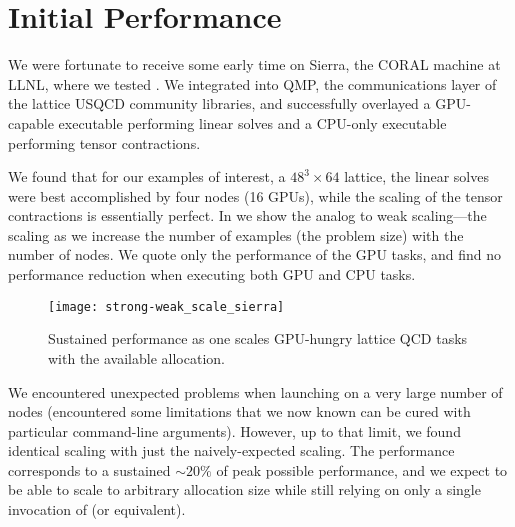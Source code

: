 \section{Initial Performance}
\label{sec:performance}

We were fortunate to receive some early time on Sierra, the CORAL machine at LLNL, where we tested \mpijm.
We integrated \mpijm into QMP\cite{githubQMP}, the communications layer of the lattice USQCD community libraries, and successfully overlayed a GPU-capable executable performing linear solves and a CPU-only executable performing tensor contractions.

We found that for our examples of interest, a $48^3\times64$ lattice, the linear solves were best accomplished by four nodes (16 GPUs), while the scaling of the tensor contractions is essentially perfect.  In  we show the analog to weak scaling---the scaling as we increase the number of examples (the problem size) with the number of nodes.  We quote only the performance of the GPU tasks, and find no performance reduction when executing both GPU and CPU tasks.

\begin{figure}[htbp]
    \centering
        \texttt{[image: strong-weak\_scale\_sierra]}
    \caption{Sustained performance as one scales GPU-hungry lattice QCD tasks with the available allocation.}
    \label{fig:sierra}
\end{figure}

We encountered unexpected problems when launching on a very large number of nodes (\mpirun encountered some limitations that we now known can be cured with particular command-line arguments).
However, up to that limit, we found identical scaling with just the naively-expected scaling.
The performance corresponds to a sustained $\sim20\%$ of peak possible performance, and we expect to be able to scale to arbitrary allocation size while still relying on only a single invocation of \mpirun (or equivalent).

